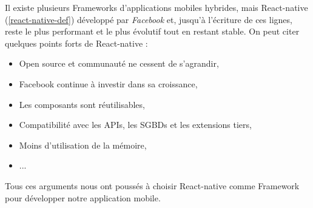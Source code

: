 Il existe plusieurs Frameworks d'applications mobiles hybrides, mais React-native (\autoref{react-native-def}) développé par \emph{Facebook} et, jusqu'à l'écriture de ces lignes, reste le plus performant et le plus évolutif tout en restant stable. On peut citer quelques points forts de React-native : 
\begin{itemize}
    \item Open source et communauté ne cessent de s'agrandir,
    \item Facebook continue à investir dans sa croissance,
    \item Les composants sont réutilisables,
    \item Compatibilité avec les APIs, les SGBDs et les extensions tiers,
    \item Moins d'utilisation de la mémoire,
    \item ...
\end{itemize}
Tous ces arguments nous ont poussés à choisir React-native comme Framework pour développer notre application mobile. 

